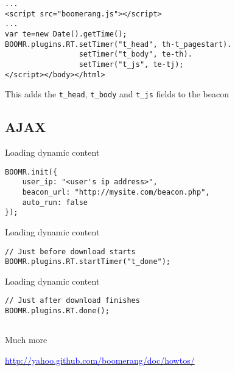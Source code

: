 \documentclass{beamer}
\begin{document}
\begin{frame}[fragile]{}
\begin{verbatim}
...
<script src="boomerang.js"></script>
...
var te=new Date().getTime();
BOOMR.plugins.RT.setTimer("t_head", th-t_pagestart).
                 setTimer("t_body", te-th).
                 setTimer("t_js", te-tj);
</script></body></html>
\end{verbatim}
\end{frame}

\begin{frame}{}
  \begin{center}
  This adds the \texttt{t\_head}, \texttt{t\_body} and \texttt{t\_js} fields to the beacon
  \end{center}
\end{frame}

\subsection{AJAX}
\begin{frame}[fragile]{Loading dynamic content}
\begin{verbatim}
BOOMR.init({
    user_ip: "<user's ip address>",
    beacon_url: "http://mysite.com/beacon.php",
    auto_run: false
});
\end{verbatim}
\end{frame}

\begin{frame}[fragile]{Loading dynamic content}
\begin{verbatim}
// Just before download starts
BOOMR.plugins.RT.startTimer("t_done");
\end{verbatim}
\end{frame}

\begin{frame}[fragile]{Loading dynamic content}
\begin{verbatim}
// Just after download finishes
BOOMR.plugins.RT.done();
\end{verbatim}
\end{frame}

\subsection{}

\begin{frame}{Much more}
  \begin{center}
  \href{http://yahoo.github.com/boomerang/doc/howtos/}{\textcolor{blue}{http://yahoo.github.com/boomerang/doc/howtos/}}
  \end{center}
\end{frame}
\end{document}
